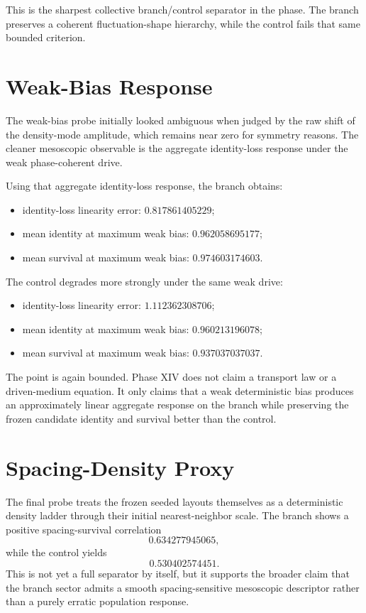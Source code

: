 \documentclass[11pt]{article}
\begin{document}
This is the sharpest collective branch/control separator in the phase. The branch preserves a coherent fluctuation-shape hierarchy, while the control fails that same bounded criterion.

\section{Weak-Bias Response}

The weak-bias probe initially looked ambiguous when judged by the raw shift of the density-mode amplitude, which remains near zero for symmetry reasons. The cleaner mesoscopic observable is the aggregate identity-loss response under the weak phase-coherent drive.

Using that aggregate identity-loss response, the branch obtains:
\begin{itemize}
\item identity-loss linearity error: $0.817861405229$;
\item mean identity at maximum weak bias: $0.962058695177$;
\item mean survival at maximum weak bias: $0.974603174603$.
\end{itemize}

The control degrades more strongly under the same weak drive:
\begin{itemize}
\item identity-loss linearity error: $1.112362308706$;
\item mean identity at maximum weak bias: $0.960213196078$;
\item mean survival at maximum weak bias: $0.937037037037$.
\end{itemize}

The point is again bounded. Phase XIV does not claim a transport law or a driven-medium equation. It only claims that a weak deterministic bias produces an approximately linear aggregate response on the branch while preserving the frozen candidate identity and survival better than the control.

\section{Spacing-Density Proxy}

The final probe treats the frozen seeded layouts themselves as a deterministic density ladder through their initial nearest-neighbor scale. The branch shows a positive spacing-survival correlation
\[
0.634277945065,
\]
while the control yields
\[
0.530402574451.
\]
This is not yet a full separator by itself, but it supports the broader claim that the branch sector admits a smooth spacing-sensitive mesoscopic descriptor rather than a purely erratic population response.
\end{document}
